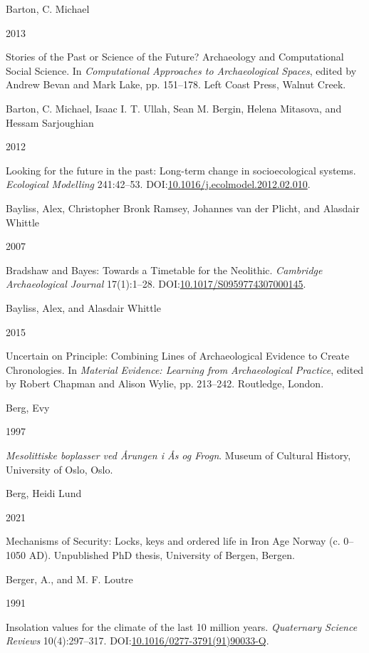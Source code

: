 \documentclass[
  12pt,
  a4paper,
  oneside]{book}
\newlength{\cslhangindent}
\newlength{\csllabelwidth}
\newlength{\cslentryspacingunit} %
\newenvironment{CSLReferences}[2] %
 {%
  \setlength{\parindent}{0pt}
  \ifodd #1
  \let\oldpar\par
  \def\par{\hangindent=\cslhangindent\oldpar}
  \fi
  \setlength{\parskip}{#2\cslentryspacingunit}
 }%
 {}
\newcommand{\CSLBlock}[1]{#1\hfill\break}
\newcommand{\CSLLeftMargin}[1]{\parbox[t]{\csllabelwidth}{#1}}
\newcommand{\CSLRightInline}[1]{\parbox[t]{\linewidth - \csllabelwidth}{#1}\break}
\begin{document}
\begin{CSLReferences}{0}{0}
\leavevmode{}%
\CSLBlock{Barton, C. Michael}
\CSLLeftMargin{ 2013}%
\CSLRightInline{{Stories of the Past or Science of the Future? Archaeology and Computational Social Science}. In \emph{{Computational Approaches to Archaeological Spaces}}, edited by Andrew Bevan and Mark Lake, pp. 151--178. Left Coast Press, Walnut Creek.}

\leavevmode{}%
\CSLBlock{Barton, C. Michael, Isaac I. T. Ullah, Sean M. Bergin, Helena Mitasova, and Hessam Sarjoughian}
\CSLLeftMargin{ 2012}%
\CSLRightInline{{Looking for the future in the past: Long-term change in socioecological systems}. \emph{Ecological Modelling} 241:42--53. DOI:\href{https://doi.org/10.1016/j.ecolmodel.2012.02.010}{10.1016/j.ecolmodel.2012.02.010}.}

\leavevmode{}%
\CSLBlock{Bayliss, Alex, Christopher Bronk Ramsey, Johannes van der Plicht, and Alasdair Whittle}
\CSLLeftMargin{ 2007}%
\CSLRightInline{{Bradshaw and Bayes: Towards a Timetable for the Neolithic}. \emph{Cambridge Archaeological Journal} 17(1):1--28. DOI:\href{https://doi.org/10.1017/S0959774307000145}{10.1017/S0959774307000145}.}

\leavevmode{}%
\CSLBlock{Bayliss, Alex, and Alasdair Whittle}
\CSLLeftMargin{ 2015}%
\CSLRightInline{{Uncertain on Principle: Combining Lines of Archaeological Evidence to Create Chronologies}. In \emph{{Material Evidence: Learning from Archaeological Practice}}, edited by Robert Chapman and Alison Wylie, pp. 213--242. Routledge, London.}

\leavevmode{}%
\CSLBlock{Berg, Evy}
\CSLLeftMargin{ 1997}%
\CSLRightInline{\emph{{Mesolittiske boplasser ved Årungen i Ås og Frogn}}. Museum of Cultural History, University of Oslo, Oslo.}

\leavevmode{}%
\CSLBlock{Berg, Heidi Lund}
\CSLLeftMargin{ 2021}%
\CSLRightInline{{Mechanisms of Security: Locks, keys and ordered life in Iron Age Norway (c. 0--1050 AD)}. Unpublished PhD thesis, University of Bergen, Bergen.}

\leavevmode{}%
\CSLBlock{Berger, A., and M. F. Loutre}
\CSLLeftMargin{ 1991}%
\CSLRightInline{Insolation values for the climate of the last 10 million years. \emph{Quaternary Science Reviews} 10(4):297--317. DOI:\href{https://doi.org/10.1016/0277-3791(91)90033-Q}{10.1016/0277-3791(91)90033-Q}.}


\end{CSLReferences}
\end{document}
